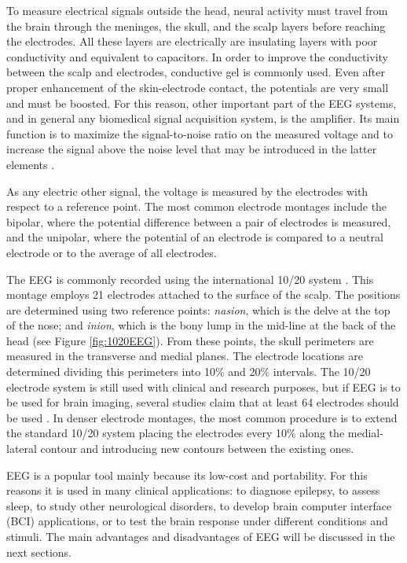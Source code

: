 To measure electrical signals outside the head, neural activity must travel from the brain through the meninges, the skull, and the scalp layers before reaching the electrodes. All these layers are electrically are insulating layers with poor conductivity and equivalent to capacitors. In order to improve the conductivity between the scalp and electrodes, conductive gel is commonly used. Even after proper enhancement of the skin-electrode contact, the potentials are very small and must be boosted. For this reason, other important part of the EEG systems, and in general any biomedical signal acquisition system, is the amplifier. Its main function is to maximize the signal-to-noise ratio on the measured voltage and to increase the signal above the noise level that may be introduced in the latter elements \citep{Jackson2014}.

As any electric other signal, the voltage is measured by the electrodes with respect to a  reference point. The most common electrode montages include the bipolar, where the potential difference between a pair of electrodes is measured, and the unipolar, where the potential of an electrode is compared to a neutral electrode or to the average of all electrodes. 

The EEG is commonly recorded using the international 10/20 system \citep{Klem1999}. This montage employs 21 electrodes attached to the surface of the scalp. The positions are determined using two reference points: \textit{nasion}, which is the delve at the top of the nose; and \textit{inion}, which is the bony lump in the mid-line at the back of the head (see Figure \ref{fig:1020EEG}). From these points, the skull perimeters are measured in the transverse and medial planes. The electrode locations are determined dividing this perimeters into 10\% and 20\% intervals. The 10/20 electrode system is still used with clinical and research purposes, but if EEG is to be used for brain imaging, several studies claim that at least 64 electrodes should be used \citep{Gotman1982}. In denser electrode montages, the most common procedure is to extend the standard 10/20 system placing the electrodes every 10\% along the medial-lateral contour and introducing new contours between the existing ones. 

EEG is a popular tool mainly because its low-cost and portability. For this reasons it is used in many clinical applications: to diagnose epilepsy, to assess sleep, to study other neurological disorders, to develop brain computer interface (BCI) applications, or to test the brain response under different conditions and stimuli. The main advantages and disadvantages of EEG will be discussed in the next sections. 

